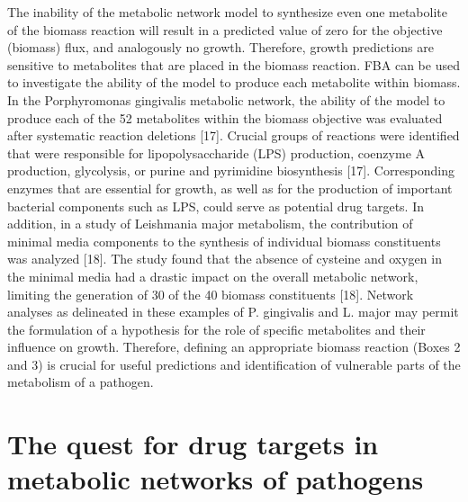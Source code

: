 The inability of the metabolic network model to synthesize even one 
metabolite of the biomass reaction will result in a predicted value 
of zero for the objective (biomass) flux, and analogously no growth. 
Therefore, growth predictions are sensitive to metabolites that are 
placed in the biomass reaction. FBA can be used to investigate the 
ability of the model to produce each metabolite within biomass. In 
the Porphyromonas gingivalis metabolic network, the ability of the 
model to produce each of the 52 metabolites within the biomass 
objective was evaluated after systematic reaction deletions [17]. 
Crucial groups of reactions were identified that were responsible for 
lipopolysaccharide (LPS) production, coenzyme A production, glycolysis, 
or purine and pyrimidine biosynthesis [17]. Corresponding enzymes that 
are essential for growth, as well as for the production of important 
bacterial components such as LPS, could serve as potential drug 
targets. In addition, in a study of Leishmania major metabolism, 
the contribution of minimal media components to the synthesis of 
individual biomass constituents was analyzed [18]. The study found 
that the absence of cysteine and oxygen in the minimal media had a 
drastic impact on the overall metabolic network, limiting the 
generation of 30 of the 40 biomass constituents [18]. Network analyses 
as delineated in these examples of P. gingivalis and L. major may 
permit the formulation of a hypothesis for the role of specific 
metabolites and their influence on growth. Therefore, defining an 
appropriate biomass reaction (Boxes 2 and 3) is crucial for useful 
predictions and identification of vulnerable parts of the metabolism 
of a pathogen.

\section{The quest for drug targets in metabolic networks of pathogens}

